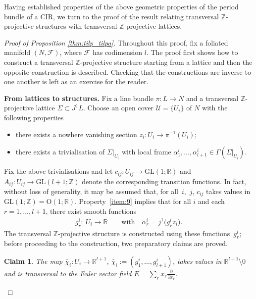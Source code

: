 \documentclass[pdftex]{sigma}
\numberwithin{equation}{section}
\newtheorem{Claim}[Theorem]{Claim}
\newcommand{\RR}{\mathbb{R}}
\newcommand{\ZZ}{\mathbb{Z}}
\begin{document}
Having established properties of the above geometric properties of the period bundle of a CIR, we turn to the proof of the result relating transversal $\ZZ$-projective structures with transversal $\ZZ$-projective lattices.

\begin{proof}[Proof of Proposition \ref{thm:tilp_tilpa}] Throughout this proof, f\/ix a foliated manifold $(N,\mathcal{F})$, where $\mathcal{F}$ has codimension $l$. The proof f\/irst shows how to construct a transversal $\ZZ$-projective structure starting from a lattice and then the opposite construction is described. Checking that the constructions are inverse to one another is left as an exercise for the reader.

{\bf From lattices to structures.} Fix a line bundle $\pi\colon L \to N$ and a transversal $\ZZ$-projective lattice $\Sigma \subset J^1L$. Choose an open cover $\mathcal{U} = \{U_i\}$ of $N$ with the following properties
 \begin{itemize}\itemsep=0pt
 \item there exists a nowhere vanishing section $z_i \colon U_i \to \pi^{-1}(U_i)$;
 \item there exists a trivialisation of $\Sigma|_{U_i}$ with local frame $\alpha^i_1,\ldots, \alpha^i_{l+1}\in \Gamma(\Sigma|_{U_i})$.
 \end{itemize}
Fix the above trivialisations and let $c_{ij}\colon U_{ij} \to \mathrm{GL}(1;\RR)$ and $A_{ij}\colon U_{ij} \to \mathrm{GL}(l+1;\ZZ)$ denote the corresponding transition functions. In fact, without loss of generality, it may be assumed that, for all~$i$,~$j$, $c_{ij}$ takes values in $\mathrm{GL}(1;\ZZ) = \mathrm{O}(1;\RR)$. Property~\ref{item:9} implies that for all $i$ and each $r = 1,\ldots, l+1$, there exist smooth functions
 \begin{gather*}
 g^i_r\colon \ U_i\to \RR\qquad \text{with}\quad \alpha^i_r = j^1\big(g_r^iz_i\big).
 \end{gather*}
The transversal $\ZZ$-projective structure is constructed using these functions~$g^i_r$; before proceeding to the construction, two preparatory claims are proved.

\begin{Claim}\label{claim:trans}
The map $\bar\chi_i\colon U_i\to \RR^{l+1}$, $\bar\chi_i:=(g^i_1,\ldots,g^i_{l+1})$, takes values in $\RR^{l+1}\setminus 0$ and is transversal to the Euler vector field $E=\sum\limits_rx_r\frac{\partial}{\partial x_r}$.
 \end{Claim}


\end{proof}
\end{document}

